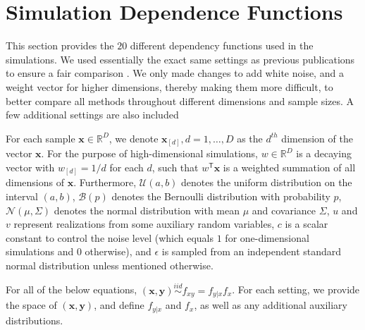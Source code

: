 \documentclass[11pt]{article}
\providecommand{\mb}[1]{\boldsymbol{#1}}
\providecommand{\mc}[1]{\mathcal{#1}}
\newcommand{\Real}{\mathbb{R}}
\newcommand{\T}{^{\ensuremath{\mathsf{T}}}}           %
\newcommand{\mbx}{\ensuremath{\mb{x}}}
\begin{document}
\clearpage

\section{Simulation Dependence Functions}
\label{appen:function}

This section provides the $20$ different dependency functions used in the simulations.  We used essentially the exact same settings as previous publications to ensure a fair comparison \cite{SzekelyRizzoBakirov2007, SimonTibshirani2012, SimonTibshirani2012, GorfineHellerHeller2012}.  We only made changes to add white noise, and a weight vector for higher dimensions, thereby making them more difficult, to better compare all methods throughout different dimensions and sample sizes. A few additional settings are also included

For each sample $\mb{x} \in \Real^{D}$, we denote $\mb{x}_{[d]}, d=1,\ldots,D$ as the $d^{th}$ dimension of the vector \mbx. For the purpose of high-dimensional simulations, $w \in \Real^{D}$ is a decaying vector with $w_{[d]}=1/d$ for each $d$, such that $w\T \mb{x}$ is a 
weighted summation of all dimensions of \mbx. %
Furthermore, $\mc{U}(a,b)$ denotes the uniform distribution on the interval $(a,b)$, $\mc{B}(p)$ denotes the Bernoulli distribution with probability $p$, $\mc{N}(\mu,{\Sigma})$ denotes the normal distribution with mean ${\mu}$ and covariance ${\Sigma}$, 
$u$ and $v$ represent realizations from some auxiliary random variables, $c$ is a scalar constant to control the noise level (which equals $1$ for one-dimensional simulations and $0$ otherwise), and $\epsilon$ is sampled from an independent standard normal distribution unless mentioned otherwise.

For all of the below equations, $(\mb{x},\mb{y}) \overset{iid}{\sim} f_{xy} = f_{y|x} f_x$. For each setting, we provide the space of $(\mb{x},\mb{y})$, and define $f_{y|x}$ and $f_x$, as well as any additional auxiliary distributions.
\end{document}
